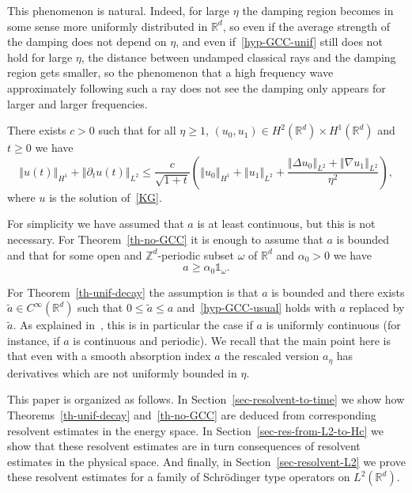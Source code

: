 \documentclass[AHL,Unicode,longabstracts]{cedram}
\newcommand{\nr}[1]{\left\Vert #1\right\Vert}
\renewcommand{\leq}{\leqslant}
\renewcommand{\geq}{\geqslant}
\newcommand{\1}{\mathds 1}
\newcommand{\R}{\mathbb{R}}
\renewcommand{\a}{\alpha}
\newcommand{\D}{\Delta}
\renewcommand{\o}{\omega}
\begin{document}
This phenomenon is natural. Indeed, for large $\eta$ the damping region becomes in some sense more uniformly distributed in $\R^d$, so even if the average strength of the damping does not depend on $\eta$, and even if~\eqref{hyp-GCC-unif} still does not hold for large $\eta$, the distance between undamped classical rays and the damping region gets smaller, so the phenomenon that a high frequency wave approximately following such a ray does not see the damping only appears for larger and larger frequencies.

\begin{theo}\label{th-no-GCC}
There exists $c > 0$ such that for all $\eta \geq 1$, $(u_0,u_1) \in H^2(\R^d) \times H^1(\R^d)$ and $t \geq 0$ we have
\[
\nr{u(t)}_{H^1} + \nr{\partial_t u(t)}_{L^2} \leq \frac c {\sqrt {1+t}} \left(\nr{u_0}_{H^1} + \nr{u_1}_{L^2} + \frac {\nr{\D u_0}_{L^2} + \nr{\nabla u_1}_{L^2}}{\eta^2} \right),
\]
where $u$ is the solution of~\eqref{KG}.
\end{theo}

For simplicity we have assumed that $a$ is at least continuous, but this is not necessary. For Theorem~\ref{th-no-GCC} it is enough to assume that $a$ is bounded and that for some open and $\mathbb Z^d$-periodic subset $\o$ of $\R^d$ and $\a_0 > 0$ we have
\begin{equation}\label{hyp-minor-a}
a \geq \a_0 \1_{\o}.
\end{equation}

For Theorem~\ref{th-unif-decay} the assumption is that $a$ is bounded and there exists $\tilde a \in C^\infty(\R^d)$ such that $0 \leq \tilde a \leq a$ and~\eqref{hyp-GCC-usual} holds with $a$ replaced by $\tilde a$. As explained in~\cite{BurqJo}, this is in particular the case if $a$ is uniformly continuous (for instance, if $a$ is continuous and periodic). We recall that the main point here is that even with a smooth absorption index $a$ the rescaled version $a_\eta$ has derivatives which are not uniformly bounded in $\eta$.%

\goodbreak
This paper is organized as follows. In Section~\ref{sec-resolvent-to-time} we show how Theorems~\ref{th-unif-decay} and~\ref{th-no-GCC} are deduced from corresponding resolvent estimates in the energy space. In Section~\ref{sec-res-from-L2-to-Hc} we show that these resolvent estimates are in turn consequences of resolvent estimates in the physical space. And finally, in Section~\ref{sec-resolvent-L2} we prove these resolvent estimates for a family of Schr\"odinger type operators on $L^2(\R^d)$.
\end{document}

